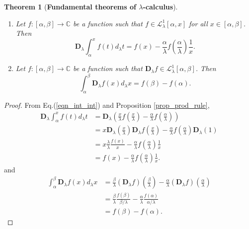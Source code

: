 \documentclass[12pt]{article}
\newcommand{\C}{\mathbb{C}}
\newtheorem{theorem}{Theorem}
\begin{document}
\begin{theorem}[{\bf Fundamental theorems of $\lambda$-calculus}]\label{theo_funda}
\begin{enumerate}
    \item Let $f:[\alpha,\beta]\rightarrow\C$ be a function such that $f\in\mathcal{L}_{\lambda}^{1}[\alpha,x]$ for all $x\in[\alpha,\beta]$. Then
    \begin{equation}
        \mathbf{D}_{\lambda}\int_{\alpha}^{x}f(t)d_{\lambda}t=f(x)-\frac{\alpha}{\lambda}f\left(\frac{\alpha}{\lambda}\right)\frac{1}{x}.
    \end{equation}
    \item Let $f:[\alpha,\beta]\rightarrow\C$ be a function such that $\mathbf{D}_{\lambda}f\in\mathcal{L}_{\lambda}^{1}[\alpha,\beta]$. Then
    \begin{equation}
        \int_{\alpha}^{\beta}\mathbf{D}_{\lambda}f(x)d_{\lambda}x=f(\beta)-f(\alpha).
    \end{equation}
\end{enumerate}
\end{theorem}
\begin{proof}
From Eq.(\ref{eqn_int_int}) and Proposition \ref{prop_prod_rule},
\begin{align*}
    \mathbf{D}_{\lambda}\int_{\alpha}^{x}f(t)d_{\lambda}t&=\mathbf{D}_{\lambda}\left(\frac{x}{\lambda}f\left(\frac{x}{\lambda}\right)-\frac{\alpha}{\lambda}f\left(\frac{\alpha}{\lambda}\right)\right)\\
    &=x\mathbf{D}_{\lambda}\left(\frac{x}{\lambda}\right)\mathbf{D}_{\lambda}f\left(\frac{x}{\lambda}\right)-\frac{\alpha}{\lambda}f\left(\frac{\alpha}{\lambda}\right)\mathbf{D}_{\lambda}(1)\\
    &=x\frac{\lambda}{\lambda}\frac{f(x)}{x}-\frac{\alpha}{\lambda}f\left(\frac{\alpha}{\lambda}\right)\frac{1}{x}\\
    &=f(x)-\frac{\alpha}{\lambda}f\left(\frac{\alpha}{\lambda}\right)\frac{1}{x}.
\end{align*}
and
\begin{align*}
    \int_{\alpha}^{\beta}\mathbf{D}_{\lambda}f(x)d_{\lambda}x&=\frac{\beta}{\lambda}(\mathbf{D}_{\lambda}f)\left(\frac{\beta}{\lambda}\right)-\frac{\alpha}{\lambda}(\mathbf{D}_{\lambda}f)\left(\frac{\alpha}{\lambda}\right)\\
    &=\frac{\beta}{\lambda}\frac{f(\beta)}{\beta/\lambda}-\frac{\alpha}{\lambda}\frac{f(\alpha)}{\alpha/\lambda}\\
    &=f(\beta)-f(\alpha).
\end{align*}
\end{proof}
\end{document}
